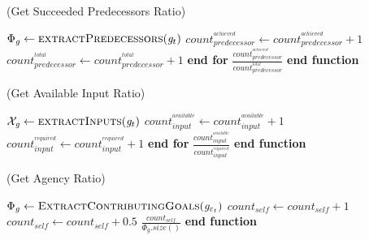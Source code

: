 \documentclass[letterpaper]{article}
\begin{document}
\begin{algorithm}
	\caption{(Get Succeeded Predecessors Ratio)}
	\label{array-sum}
	\begin{algorithmic}[1]
			\Statex
			\State $\Phi_{\mathit{g}} \gets
			\Call{extractPredecessors}{\mathit{g}_t}$
			\Statex
					\State $count_{predecessor}^{^{achieved}} \gets
					count_{predecessor}^{^{achieved}} + 1$
				\EndIf
				\Statex
				\State $count_{predecessor}^{^{total}} \gets count_{predecessor}^{^{total}} + 1$
			\EndFor \State \textbf{end for}
			\Statex
			\State \Return
			$\frac{count_{predecessor}^{^{achieved}}}{count_{predecessor}^{^{total}}}$
		\EndFunction 
	\State \textbf{end function}
	\end{algorithmic}
\end{algorithm}

\begin{algorithm}
	\caption{(Get Available Input Ratio)}
	\label{array-sum}
	\begin{algorithmic}[1]
			\Statex
			\State $\mathcal{X}_{\mathit{g}} \gets
			\Call{extractInputs}{\mathit{g}_t}$
			\Statex
					\State $count_{input}^{^{available}} \gets count_{input}^{^{available}} + 1$
				\EndIf
				\Statex
				\State $count_{input}^{^{required}} \gets count_{input}^{^{required}} + 1$
			\EndFor \State \textbf{end for}
			\Statex
			\State \Return
			$\frac{count_{input}^{^{available}}}{count_{input}^{^{required}}}$
		\EndFunction 
	\State \textbf{end function}
	\end{algorithmic}
\end{algorithm}

\begin{algorithm}
	\caption{(Get Agency Ratio)}
	\label{array-sum}
	\begin{algorithmic}[1]
			\Statex
			\State $\Phi_{\mathit{g}} \gets
			\Call{ExtractContributingGoals}{\mathit{g}_{\varepsilon_t}}$
			\Statex
				 \State $count_{self}
				\gets count_{self} + 1$
				\Statex
				 \State $count_{self}
				\gets count_{self} + 0.5$
				\EndIf
			\EndFor
			\Statex
			\State \Return 
			$\frac{count_{self}}{{\Phi_{\mathit{g}}}.size()}$
		\EndFunction 
	\State \textbf{end function}
	\end{algorithmic}
\end{algorithm}
\end{document}
